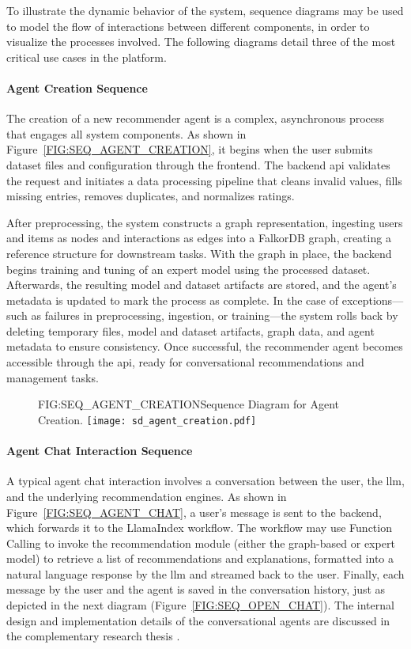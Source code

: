 To illustrate the dynamic behavior of the system, sequence diagrams may be used to model the flow of interactions between different components, in order to visualize the processes involved. The following diagrams detail three of the most critical use cases in the platform.

\paragraph{Agent Creation Sequence}
The creation of a new recommender agent is a complex, asynchronous process that engages all system components. As shown in Figure~\ref{FIG:SEQ_AGENT_CREATION}, it begins when the user submits dataset files and configuration through the frontend. The backend \acs{api} validates the request and initiates a data processing pipeline that cleans invalid values, fills missing entries, removes duplicates, and normalizes ratings. 

After preprocessing, the system constructs a graph representation, ingesting users and items as nodes and interactions as edges into a FalkorDB graph, creating a reference structure for downstream tasks. With the graph in place, the backend begins training and tuning of an expert model using the processed dataset. Afterwards, the resulting model and dataset artifacts are stored, and the agent's metadata is updated to mark the process as complete. In the case of exceptions---such as failures in preprocessing, ingestion, or training---the system rolls back by deleting temporary files, model and dataset artifacts, graph data, and agent metadata to ensure consistency. Once successful, the recommender agent becomes accessible through the \acs{api}, ready for conversational recommendations and management tasks.

\newpage

\begin{figure}[Sequence Diagram for Agent Creation]{FIG:SEQ_AGENT_CREATION}{Sequence Diagram for Agent Creation.}
    \texttt{[image: sd\_agent\_creation.pdf]}
\end{figure}

\paragraph{Agent Chat Interaction Sequence}
A typical agent chat interaction involves a conversation between the user, the \ac{llm}, and the underlying recommendation engines. As shown in Figure~\ref{FIG:SEQ_AGENT_CHAT}, a user's message is sent to the backend, which forwards it to the LlamaIndex workflow. The workflow may use Function Calling to invoke the recommendation module (either the graph-based or expert model) to retrieve a list of recommendations and explanations, formatted into a natural language response by the \ac{llm} and streamed back to the user. Finally, each message by the user and the agent is saved in the conversation history, just as depicted in the next diagram (Figure~\ref{FIG:SEQ_OPEN_CHAT}). The internal design and implementation details of the conversational agents are discussed in the complementary research thesis \cite{MUI2ICSI-THESIS}.

